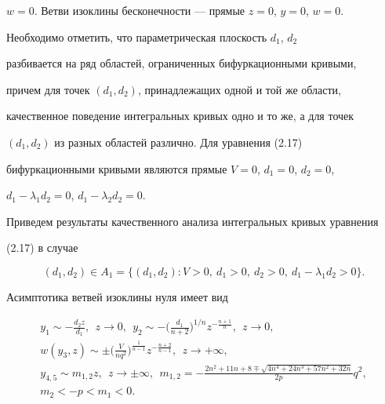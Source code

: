 $w=0$. Ветви изоклины бесконечности --- прямые $z=0$, $y=0$, $w=0$. 


 


Необходимо отметить, что параметрическая плоскость $d_1$, $d_2$ 


разбивается на ряд областей, ограниченных бифуркационными кривыми, 


причем для точек $(d_1,d_2)$, принадлежащих одной и той же области, 


качественное поведение интегральных кривых одно и то же, а для точек 


$(d_1,d_2)$ из разных областей различно. Для уравнения (2.17) 


бифуркационными кривыми являются прямые $V=0$, $d_1=0$, $d_2=0$, 


$d_1-\lambda_1d_2=0$, $d_1-\lambda_2d_2=0$. 


 


Приведем результаты качественного анализа интегральных кривых уравнения 


(2.17) в случае 


$$ 


(d_1,d_2)\in A_1=\{(d_1,d_2):V>0,\ d_1>0,\ d_2>0, 


\ d_1-\lambda_1d_2>0\}. 


$$ 


Асимптотика ветвей изоклины нуля имеет вид 


\begin{gather*} 


y_1\sim -\frac{d_2z}{d_1},\ \ z\to 0,\ \ y_2\sim-\bigg( 


\frac{d_1}{n+2}\bigg)^{1/n}z^{-\frac{n+1}{n}},\ \ z\to0,\\ 


% 


w(y_3,z)\sim\pm\bigg(\frac{V}{n q^2} \bigg)^{\frac{1}{n-1}} 


z^{-\frac{n+2}{n-1}},\ \ z\to+\infty, \\ 


y_{4,5}\sim m_{1,2}z,\ \ z\to\pm\infty, 


\ \ m_{1,2}=-\frac{2n^2+11n+8\mp\sqrt{4n^4+24n^3+57n^2+32n}} 


{2p}q^2, \\ 


% 


m_2<-p<m_1<0. 


\end{gather*} 


